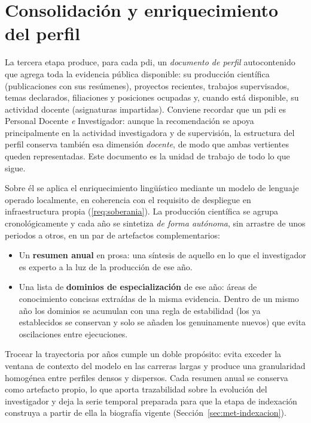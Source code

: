 \section{Consolidación y enriquecimiento del perfil}
\label{sec:met-enriquecimiento}

La tercera etapa produce, para cada \gls{pdi}, un \emph{documento de perfil} autocontenido que agrega toda la evidencia pública disponible: su producción científica (publicaciones con sus resúmenes), proyectos recientes, trabajos supervisados, temas declarados, filiaciones y posiciones ocupadas y, cuando está disponible, su actividad docente (asignaturas impartidas).
Conviene recordar que un \gls{pdi} es Personal Docente \emph{e} Investigador: aunque la recomendación se apoya principalmente en la actividad investigadora y de supervisión, la estructura del perfil conserva también esa dimensión \emph{docente}, de modo que ambas vertientes queden representadas.
Este documento es la unidad de trabajo de todo lo que sigue.

Sobre él se aplica el enriquecimiento lingüístico mediante un modelo de lenguaje operado localmente, en coherencia con el requisito de despliegue en infraestructura propia (\ref{req:soberania}).
La producción científica se agrupa cronológicamente y cada año se sintetiza \emph{de forma autónoma}, sin arrastre de unos periodos a otros, en un par de artefactos complementarios:

\begin{itemize}
    \item Un \textbf{resumen anual} en prosa: una síntesis de aquello en lo que el investigador es experto a la luz de la producción de ese año.
    \item Una lista de \textbf{dominios de especialización} de ese año: áreas de conocimiento concisas extraídas de la misma evidencia.
    Dentro de un mismo año los dominios se acumulan con una regla de estabilidad (los ya establecidos se conservan y solo se añaden los genuinamente nuevos) que evita oscilaciones entre ejecuciones.
\end{itemize}

Trocear la trayectoria por años cumple un doble propósito: evita exceder la ventana de contexto del modelo en las carreras largas y produce una granularidad homogénea entre perfiles densos y dispersos.
Cada resumen anual se conserva como artefacto propio, lo que aporta trazabilidad sobre la evolución del investigador y deja la serie temporal preparada para que la etapa de indexación construya a partir de ella la biografía vigente (Sección~\ref{sec:met-indexacion}).

